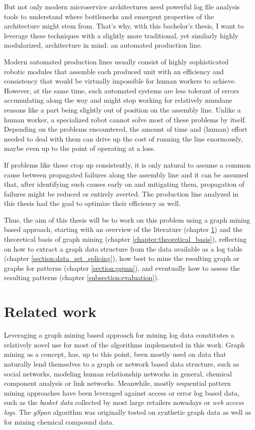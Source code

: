 \documentclass[pdftex,12pt,a4paper]{report}
\begin{document}
But not only modern microservice architectures need powerful log file analysis tools to understand where bottlenecks and emergent properties of the architecture might stem from. That's why, with this bachelor's thesis, I want to leverage these techniques with a slightly more traditional, yet similarly highly modularized, architecture in mind: an automated production line.

Modern automated production lines usually consist of highly sophisticated robotic modules that assemble each produced unit with an efficiency and consistency that would be virtually impossible for human workers to achieve. However, at the same time, such automated systems are less tolerant of errors accumulating along the way and might stop working for relatively mundane reasons like a part being slightly out of position on the assembly line. Unlike a human worker, a specialized robot cannot solve most of these problems by itself. Depending on the problems encountered, the amount of time and (human) effort needed to deal with them can drive up the cost of running the line enormously, maybe even up to the point of operating at a loss.

If problems like these crop up consistently, it is only natural to assume a common cause between propagated failures along the assembly line\cite{Ringsquandl2016-en} and it can be assumed that, after identifying such causes early on and mitigating them, propagation of failures might be reduced or entirely averted. The production line analyzed in this thesis had the goal to optimize their efficiency as well.

Thus, the aim of this thesis will be to work on this problem using a graph mining based approach, starting with an overview of the literature (chapter \ref{chapter:related_work}) and the theoretical basis of graph mining (chapter \ref{chapter:theoretical_basis}), reflecting on how to extract a graph data structure from the data available as a log table (chapter \ref{section:data_set_splicing}), how best to mine the resulting graph or graphs for patterns (chapter \ref{section:gspan}), and eventually how to assess the resulting patterns (chapter \ref{subsection:evaluation}).

\chapter{Related work}
\label{chapter:related_work}
Leveraging a graph mining based approach for mining log data constitutes a relatively novel use for most of the algorithms implemented in this work. Graph mining as a concept, has, up to this point, been mostly used on data that naturally lend themselves to a graph or network based data structure, such as social networks, modeling human relationship networks in general, chemical component analysis or link networks.\cite{Washio2003-fc}\cite{Han2007-qx} Meanwhile, mostly sequential pattern mining approaches have been leveraged against access or error log based data, such as the \textit{basket data} collected by most large retailers nowadays\cite{Agrawal1993-nc} or \textit{web access logs}\cite{Pei2000-rz}. The \textit{gSpan} algorithm was originally tested on synthetic graph data as well as for mining chemical compound data.\cite{Yan2002-sj}
\end{document}
